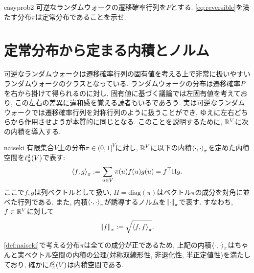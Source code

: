 \begin{exercise}{easy}{prob2}
    可逆なランダムウォークの遷移確率行列を$P$とする.
    \cref{eq:reversible}を満たす分布$\pi$は定常分布であることを示せ.
\end{exercise}

%


\section{定常分布から定まる内積とノルム}
可逆なランダムウォークは遷移確率行列の固有値を考える上で非常に扱いやすいランダムウォークのクラスとなっている.
ランダムウォークの分布は遷移確率$P$を右から掛けて得られるのに対し,
固有値に基づく議論では左固有値を考えており,
この左右の差異に違和感を覚える読者もいるであろう.
実は可逆なランダムウォークでは遷移確率行列を対称行列のように扱うことができ,
ゆえに左右どちらから作用させようが本質的に同じとなる.
このことを説明するために, $\mathbb{R}^V$に次の内積を導入する.
\begin{definition}{}{naiseki}
    有限集合$V$上の分布$\pi\in(0,1]^V$に対し,
    $\mathbb{R}^V$に以下の内積$\left\langle\cdot,\cdot\right\rangle_{\pi}$を定めた内積空間を$\ell^2_\pi(V)$で表す:
    \begin{align*}
        \left\langle f,g\right\rangle_{\pi} \mathrel{:=} \sum_{u \in V} \pi(u) f(u) g(u)
        = f^\top \Pi g.
    \end{align*}
    ここで$f,g$は列ベクトルとして扱い, $\Pi=\mathrm{diag}(\pi)$はベクトル$\pi$の成分を対角に並べた行列である.
    また, 内積$\left\langle\cdot,\cdot\right\rangle_{\pi}$が誘導するノルムを$\left\lVert\cdot\right\rVert_{\pi}$で表す.
    すなわち, $f\in\mathbb{R}^V$に対して
    \[
        \left\lVert f\right\rVert_{\pi} \mathrel{:=} \sqrt{\left\langle f,f\right\rangle_{\pi}}.
    \]
\end{definition}
\cref{def:naiseki}で考える分布$\pi$は全ての成分が正であるため,
上記の内積$\left\langle\cdot,\cdot\right\rangle_{\pi}$はちゃんと実ベクトル空間の内積の公理(対称双線形性, 非退化性, 半正定値性)を満たしており,
確かに$\ell^2_\pi(V)$は内積空間である.

